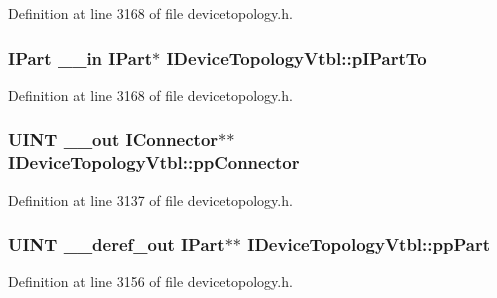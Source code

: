 Definition at line 3168 of file devicetopology.\+h.

\subsubsection[{\texorpdfstring{p\+I\+Part\+To}{pIPartTo}}]{ {\bf I\+Part} {\bf \+\_\+\+\_\+in} {\bf I\+Part}$\ast$ I\+Device\+Topology\+Vtbl\+::p\+I\+Part\+To}\hypertarget{struct_i_device_topology_vtbl_a74706b142e309df3b3c7357432415903}{}\label{struct_i_device_topology_vtbl_a74706b142e309df3b3c7357432415903}


Definition at line 3168 of file devicetopology.\+h.

\subsubsection[{\texorpdfstring{pp\+Connector}{ppConnector}}]{ {\bf U\+I\+NT} {\bf \+\_\+\+\_\+out} {\bf I\+Connector}$\ast$$\ast$ I\+Device\+Topology\+Vtbl\+::pp\+Connector}\hypertarget{struct_i_device_topology_vtbl_a2b68a777a086913c92507042db2676ac}{}\label{struct_i_device_topology_vtbl_a2b68a777a086913c92507042db2676ac}


Definition at line 3137 of file devicetopology.\+h.

\subsubsection[{\texorpdfstring{pp\+Part}{ppPart}}]{ {\bf U\+I\+NT} {\bf \+\_\+\+\_\+deref\+\_\+out} {\bf I\+Part}$\ast$$\ast$ I\+Device\+Topology\+Vtbl\+::pp\+Part}\hypertarget{struct_i_device_topology_vtbl_ae04785f0aeacfcdcc0ad41260c071303}{}\label{struct_i_device_topology_vtbl_ae04785f0aeacfcdcc0ad41260c071303}


Definition at line 3156 of file devicetopology.\+h.

